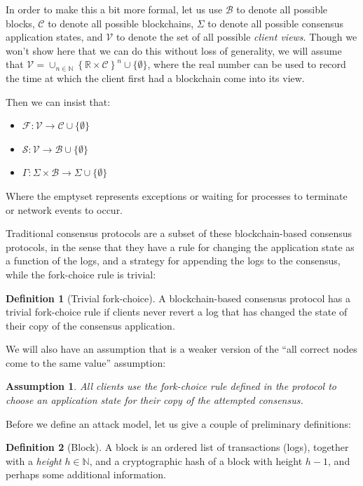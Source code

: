 \documentclass[11pt,a4paper]{article}
\theoremstyle{plain}
\newtheorem{assm}{Assumption}
\theoremstyle{definition}
\newtheorem{defn}{Definition}
\begin{document}
In order to make this a bit more formal, let us use $\mathcal{B}$ to denote all possible blocks, $\mathcal{C}$ to denote all possible blockchains, $\Sigma$ to denote all possible consensus application states, and $\mathcal{V}$ to denote the set of all possible \emph{client views}. Though we won't show here that we can do this without loss of generality, we will assume that $\mathcal{V} = \cup_{n \in \mathbb{N}}\left\{\mathbb{R} \times \mathcal{C}\right\}^n \cup \{\emptyset \}$, where the real number can be used to record the time at which the client first had a blockchain come into its view.

Then we can insist that:
\begin{itemize}
\item $\mathcal{F}:\mathcal{V} \to \mathcal{C} \cup \{\emptyset \}$
\item $\mathcal{S}:\mathcal{V} \to \mathcal{B} \cup \{\emptyset \}$
\item $\Gamma: \Sigma \times \mathcal{B} \to \Sigma \cup \{\emptyset \}$
\end{itemize}

Where the emptyset represents exceptions or waiting for processes to terminate or network events to occur.

Traditional consensus protocols are a subset of these blockchain-based consensus protocols, in the sense that they have a rule for changing the application state as a function of the logs, and a strategy for appending the logs to the consensus, while the fork-choice rule is trivial:

\begin{defn}[Trivial fork-choice]
A blockchain-based consensus protocol has a trivial fork-choice rule if clients never revert a log that has changed the state of their copy of the consensus application.
\end{defn}

We will also have an assumption that is a weaker version of the ``all correct nodes come to the same value'' assumption:

\begin{assm}
All clients use the fork-choice rule defined in the protocol to choose an application state for their copy of the attempted consensus.
\end{assm}

Before we define an attack model, let us give a couple of preliminary definitions:

\begin{defn}[Block]
A block is an ordered list of transactions (logs), together with a \emph{height} $h \in \mathbb{N}$, and a cryptographic hash of a block with height $h - 1$, and perhaps some additional information. 
\end{defn}
\end{document}

